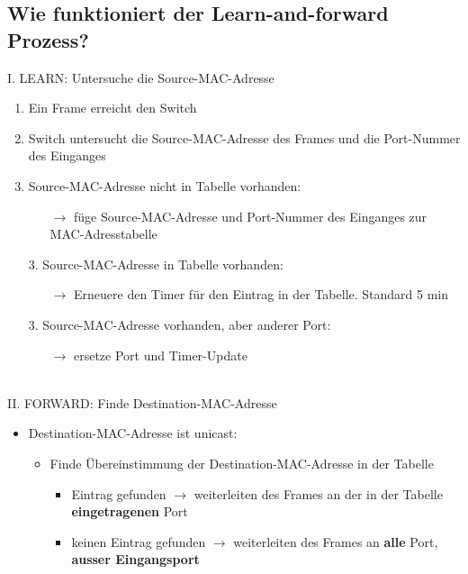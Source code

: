 \subsection*{Wie funktioniert der \flqq Learn-and-forward\frqq{} Prozess?}
I. LEARN: Untersuche die Source-MAC-Adresse
\begin{enumerate}
    \item Ein Frame erreicht den Switch
    \item Switch untersucht die Source-MAC-Adresse des Frames und die Port-Nummer des Einganges
    \item Source-MAC-Adresse nicht in Tabelle vorhanden:
    \begin{itemize}
        \item[$\rightarrow$] füge Source-MAC-Adresse und Port-Nummer des Einganges zur MAC-Adresstabelle
    \end{itemize}
    \item[3.] Source-MAC-Adresse in Tabelle vorhanden:
    \begin{itemize}
        \item[$\rightarrow$] Erneuere den Timer für den Eintrag in der Tabelle. Standard 5 min
    \end{itemize}
    \item[3.] Source-MAC-Adresse vorhanden, aber anderer Port:
    \begin{itemize}
        \item[$\rightarrow$] ersetze Port und Timer-Update
    \end{itemize}
\end{enumerate}\,\\[1em]

II. FORWARD: Finde Destination-MAC-Adresse
\begin{itemize}
    \item Destination-MAC-Adresse ist unicast:
    \begin{itemize}
        \item Finde Übereinstimmung der Destination-MAC-Adresse in der Tabelle
        \begin{itemize}
            \item Eintrag gefunden $\rightarrow$ weiterleiten des Frames an der in der Tabelle \textbf{eingetragenen} Port
            \item keinen Eintrag gefunden $\rightarrow$ weiterleiten des Frames an \textbf{alle} Port, \textbf{ausser Eingangsport}
        \end{itemize}
    \end{itemize}
\end{itemize}

